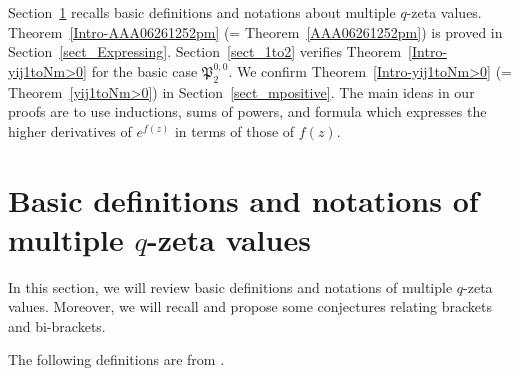 \documentclass[12pt, reqno]{amsart}
\theoremstyle{definition}
\theoremstyle{remark}
\numberwithin{equation}{section}
\numberwithin{equation}{section}
\begin{document}
Section~\ref{sect_Basic_def} recalls basic definitions and notations 
about multiple $q$-zeta values. Theorem~\ref{Intro-AAA06261252pm} 
(= Theorem~\ref{AAA06261252pm}) is proved in Section~\ref{sect_Expressing}. 
Section~\ref{sect_1to2} verifies Theorem~\ref{Intro-yij1toNm>0} 
for the basic case $\mathfrak P_{2}^{0,0}$. We confirm 
Theorem~\ref{Intro-yij1toNm>0} (= Theorem~\ref{yij1toNm>0}) in 
Section~\ref{sect_mpositive}. The main ideas in our proofs are to 
use inductions, sums of powers, and formula \cite[(6.9)]{BO} 
which expresses the higher derivatives of $e^{f(z)}$ in terms of 
those of $f(z)$. 


\section{\bf Basic definitions and notations of multiple $q$-zeta values} 
\label{sect_Basic_def}

In this section, we will review basic definitions and notations of 
multiple $q$-zeta values. Moreover, we will recall and propose 
some conjectures relating brackets and bi-brackets. 

The following definitions are from \cite{BK1, BK3, Oko}.
\end{document}

